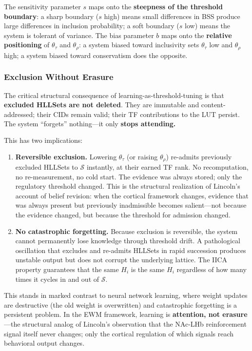 \documentclass[11pt,a4paper]{article}
\theoremstyle{remark}
\begin{document}
The sensitivity parameter $s$ maps onto the \textbf{steepness of the
threshold boundary}: a sharp boundary ($s$ high) means small differences in
BSS produce large differences in inclusion probability; a soft boundary ($s$
low) means the system is tolerant of variance. The bias parameter $b$ maps
onto the \textbf{relative positioning} of $\theta_{\tau}$ and
$\theta_{\rho}$: a system biased toward inclusivity sets $\theta_{\tau}$
low and $\theta_{\rho}$ high; a system biased toward conservatism does the
opposite.

\subsubsection{Exclusion Without Erasure}

The critical structural consequence of learning-as-threshold-tuning is that
\textbf{excluded HLLSets are not deleted}. They are immutable and
content-addressed; their CIDs remain valid; their TF contributions to the LUT
persist. The system ``forgets'' nothing---it only \textbf{stops attending.}

This has two implications:

\begin{enumerate}[leftmargin=*,nosep]
  \item \textbf{Reversible exclusion.} Lowering $\theta_{\tau}$ (or raising
    $\theta_{\rho}$) re-admits previously excluded HLLSets to $\mathcal{S}$
    instantly, at their earned TF rank. No recomputation, no re-measurement, no
    cold start. The evidence was always stored; only the regulatory threshold
    changed. This is the structural realization of Lincoln's account of belief
    revision: when the cortical framework changes, evidence that was always
    present but previously inadmissible becomes salient---not because the
    evidence changed, but because the threshold for admission changed.
  \item \textbf{No catastrophic forgetting.} Because exclusion is reversible,
    the system cannot permanently lose knowledge through threshold drift. A
    pathological oscillation that excludes and re-admits HLLSets in rapid
    succession produces unstable output but does not corrupt the underlying
    lattice. The IICA property guarantees that the same $H_i$ is the same
    $H_i$ regardless of how many times it cycles in and out of $\mathcal{S}$.
\end{enumerate}

This stands in marked contrast to neural network learning, where weight
updates are destructive (the old weight is overwritten) and catastrophic
forgetting is a persistent problem. In the EWM framework, learning is
\textbf{attention, not erasure}---the structural analog of Lincoln's
observation that the NAc-LHb reinforcement signal itself never changes; only
the cortical regulation of which signals reach behavioral output changes.
\end{document}
